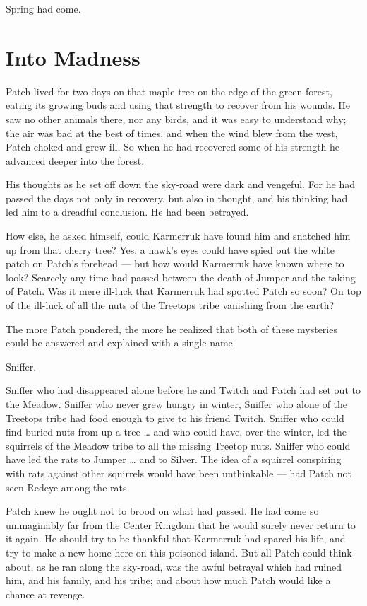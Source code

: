 \documentclass[ebook,oneside,openany,17pt]{memoir}
\renewcommand{\thechapter}{\Roman{chapter}}
\newcounter{sections}
\newcommand{\sections}[1]{%
  \section*{#1}
  \addtocounter{sections}{1}%
  \pdfbookmark[1]{#1}{section.\thechapter.\thesections}}
\begin{document}
Spring had come.


\sections{Into Madness}

Patch lived for two days on that maple tree on the edge of the green
forest, eating its growing buds and using that strength to recover
from his wounds. He saw no other animals there, nor any birds, and it
was easy to understand why; the air was bad at the best of times, and
when the wind blew from the west, Patch choked and grew ill. So when
he had recovered some of his strength he advanced deeper into the
forest.

His thoughts as he set off down the sky-road were dark and
vengeful. For he had passed the days not only in recovery, but also in
thought, and his thinking had led him to a dreadful conclusion. He had
been betrayed.

How else, he asked himself, could Karmerruk have found him and
snatched him up from that cherry tree? Yes, a hawk’s eyes could have
spied out the white patch on Patch’s forehead — but how would
Karmerruk have known where to look? Scarcely any time had passed
between the death of Jumper and the taking of Patch. Was it mere
ill-luck that Karmerruk had spotted Patch so soon? On top of the
ill-luck of all the nuts of the Treetops tribe vanishing from the
earth?

The more Patch pondered, the more he realized that both of these
mysteries could be answered and explained with a single name.

Sniffer.

Sniffer who had disappeared alone before he and Twitch and Patch had
set out to the Meadow. Sniffer who never grew hungry in winter,
Sniffer who alone of the Treetops tribe had food enough to give to his
friend Twitch, Sniffer who could find buried nuts from up a tree … and
who could have, over the winter, led the squirrels of the Meadow tribe
to all the missing Treetop nuts. Sniffer who could have led the rats
to Jumper … and to Silver. The idea of a squirrel conspiring with rats
against other squirrels would have been unthinkable — had Patch not
seen Redeye among the rats.

Patch knew he ought not to brood on what had passed. He had come so
unimaginably far from the Center Kingdom that he would surely never
return to it again. He should try to be thankful that Karmerruk had
spared his life, and try to make a new home here on this poisoned
island. But all Patch could think about, as he ran along the sky-road,
was the awful betrayal which had ruined him, and his family, and his
tribe; and about how much Patch would like a chance at revenge.
\end{document}
